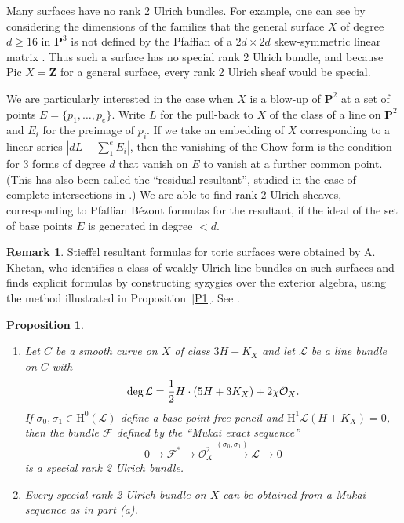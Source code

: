 \documentclass{jams-l}
\newtheorem{proposition}[theorem]{Proposition}
\theoremstyle{definition}
\newtheorem{furtherwork}[theorem]{Remark}
\theoremstyle{remark}
\newcommand{\F}{{\mathcal F}}
\newcommand{\Hrm}{{\mathrm H}}
\newcommand{\cL}{{\mathcal L}}
\newcommand{\cO}{{\mathcal O}}
\newcommand{\PP}{{\mathbf P}}
\newcommand{\ZZ}{{\mathbf Z}}
\newcommand{\rTo}{\xrightarrow}
\newcommand{\rTox}{\rightarrow}
\begin{document}
Many surfaces have no rank 2 Ulrich bundles. 
For example, one can see by considering the
dimensions of the families that
the general surface $X$ of degree $d\ge 16$ in $\PP^3$ 
is not defined by the Pfaffian
of a $2d \times 2d$ skew-symmetric linear matrix
\cite{Beauville 2000}.
Thus such a surface has no special rank 2 Ulrich bundle,
and because Pic $X=\ZZ$ for a general surface, every
rank 2 Ulrich sheaf would be special.

We are particularly interested in the case when $X$ is
a blow-up of $\PP^2$ at a set of points
$E=\{p_1,\dots,p_e\}$. Write $L$ for the pull-back to 
$X$ of the class of a line on $\PP^2$ and $E_i$ for the
preimage of $p_i$. If we take an embedding
of $X$ corresponding to a linear series $|dL-\sum_1^eE_i|$, 
then the vanishing of the Chow form is the condition
for 3 forms of degree $d$ that vanish 
on $E$ to vanish at a further common point. (This has also
been called the ``residual resultant'', studied in the case of
complete intersections in \cite{Buseetal.2001}.)
We are able to find rank 2 Ulrich sheaves, corresponding to
Pfaffian B\'ezout formulas for the resultant, if the ideal
of the set of base points $E$ is generated in
degree $<d$.

\begin{furtherwork}
Stieffel resultant formulas for toric surfaces were obtained by 
A. Khetan, who identifies a class of 
weakly Ulrich line bundles on such surfaces
and finds explicit formulas by constructing syzygies over
the exterior algebra, using the method illustrated in 
Proposition~\ref{P1}.  See \cite{Khetan 2002}.
\end{furtherwork}

\begin{proposition}\label{Ulrich on a surface}
\begin{enumerate}
\item[(a)] Let $C$ be a smooth curve on $X$ of class $3H+K_X$ and let $\cL$ be a line
bundle on $C$ with
\[
\deg \cL = {1\over2} H\cdot(5H+3K_X) + 2\chi\cO_X.
\]
If $\sigma_0,\sigma_1\in \Hrm^0(\cL)$ define a base point free pencil
and  $\Hrm^1 \cL(H+K_X)=0$,
then the bundle $\F$ defined by the ``Mukai exact sequence''
\[
0 \rTox \F^* \rTox \cO^2_X \rTo{(\sigma_0,\sigma_1)} \cL \rTox 0
\] 
is a special rank 2 Ulrich bundle. 
\item[(b)]Every special rank 2 Ulrich bundle on $X$
can be obtained from a Mukai sequence as in part \textup{(a)}.
\end{enumerate}
\end{proposition}
\end{document}
